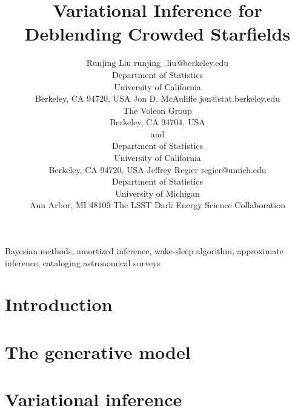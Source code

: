 \documentclass[twoside,11pt]{article}
\begin{document}
\title{Variational Inference for Deblending Crowded Starfields}

\author{\name Runjing Liu
    \email runjing\_liu@berkeley.edu \\
    \addr Department of Statistics\\
    University of California\\
    Berkeley, CA 94720, USA
    \AND
    \name Jon D. McAuliffe
    \email jon@stat.berkeley.edu \\
    \addr
    The Voleon Group \\
    Berkeley, CA 94704, USA \\
    and\\
    Department of Statistics\\
    University of California\\
    Berkeley, CA 94720, USA
    \AND
    \name Jeffrey Regier
    \email regier@umich.edu \\
    \addr
    Department of Statistics \\
    University of Michigan \\
    Ann Arbor, MI 48109
    \AND
    \name The LSST Dark Energy Science Collaboration
    }

\editor{}

\maketitle

\begin{abstract}%

\end{abstract}

\begin{keywords}
  Bayesian methods, amortized inference, wake-sleep algorithm, approximate inference, cataloging astronomical surveys
\end{keywords}

\section{Introduction}
\label{sec:intro}


\section{The generative model}
\label{sec:gen_model}


\section{Variational inference}
\label{sec:var_inference}

\end{document}
